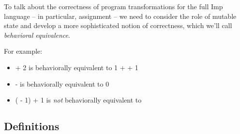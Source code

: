 \documentclass[12pt]{report}
\begin{document}
    To talk about the correctness of program transformations for the
    full Imp language -- in particular, assignment -- we need to
    consider the role of mutable state and develop a more
    sophisticated notion of correctness, which we'll call \textit{behavioral
    equivalence}. 

 For example:

\begin{itemize}
\item  {} + 2 is behaviorally equivalent to 1 +  + 1

\item  {} -  is behaviorally equivalent to 0

\item  ( - 1) + 1 is \textit{not} behaviorally equivalent to    

\end{itemize}
\begin{coqdoccode}
\coqdocemptyline
\end{coqdoccode}
\subsection{Definitions}
\end{document}
